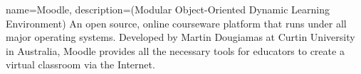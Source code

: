 {
        name=Moodle,
        description={(Modular Object-Oriented Dynamic Learning Environment) An open source, online courseware platform that runs under all major operating systems. Developed by Martin Dougiamas at Curtin University in Australia, Moodle provides all the necessary tools for educators to create a virtual classroom via the Internet. \cite{crosslin2010course}}
}